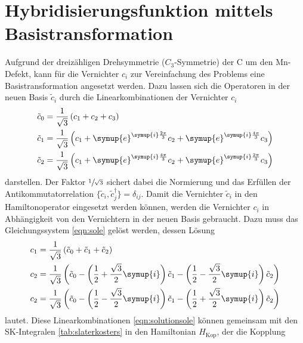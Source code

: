 \section{Hybridisierungsfunktion mittels Basistransformation}
Aufgrund der dreizähligen Drehsymmetrie ($C_3$-Symmetrie) der C um den Mn-Defekt, kann für die Vernichter $c_i$ zur Vereinfachung des Problems eine
Basistransformation angesetzt werden.
Dazu lassen sich die Operatoren in der neuen Basis $\tilde{c}_i$ durch die Linearkombinationen der Vernichter $c_i$
\begin{equation}
    \begin{aligned}
    \tilde{c}_0 &= \frac{1}{\sqrt{3}}\left (c_1 + c_2 + c_3 \right ) \\
    \tilde{c}_1 &= \frac{1}{\sqrt{3}}\left (c_1+ \symup{e}^{\symup{i}\frac{2\pi}{3}} c_2 + \symup{e}^{\symup{i}\frac{4\pi}{3}}c_3 \right ) \\
    \tilde{c}_2 &= \frac{1}{\sqrt{3}}\left (c_1 + \symup{e}^{\symup{i}\frac{4\pi}{3}} c_2 + \symup{e}^{\symup{i}\frac{2\pi}{3}}c_3 \right ) \label{eqn:sole} 
    \end{aligned}
\end{equation}
darstellen. 
Der Faktor $\sfrac{1}{\sqrt{3}}$ sichert dabei die Normierung und das Erfüllen der Antikommutatorrelation $\{\tilde{c}_i,\tilde{c}^\dagger_j\} = \delta_{ij}$.
Damit die Vernichter $\tilde{c}_i$ in den Hamiltonoperator eingesetzt werden können, werden die Vernichter $c_i$ in Abhängigkeit von den Vernichtern in
der neuen Basis gebraucht. 
Dazu muss das Gleichungssystem \eqref{eqn:sole} gelöst werden, dessen Lösung    
\begin{equation}
    \begin{aligned}
    c_1 &= \frac{1}{\sqrt{3}}\left (\tilde{c}_0 + \tilde{c}_1 + \tilde{c}_2 \right ) \\
    c_2 &= \frac{1}{\sqrt{3}}\left (\tilde{c}_0 - \left(\frac{1}{2} + \frac{{\sqrt{3}}}{2} \symup{i} \right) \tilde{c}_1 - \left ( \frac{1}{2} - \frac{{\sqrt{3}}}{2} \symup{i} \right ) \tilde{c}_2 \right ) \\
    c_2 &= \frac{1}{\sqrt{3}}\left (\tilde{c}_0 - \left(  \frac{1}{2} - \frac{{\sqrt{3}}}{2} \symup{i} \right) \tilde{c}_1 - \left ( \frac{1}{2} + \frac{{\sqrt{3}}}{2} \symup{i} \right ) \tilde{c}_2 \right ) 
    \label{eqn:solutionsole}
    \end{aligned}
\end{equation}
lautet.
Diese Linearkombinationen \eqref{eqn:solutionsole} können gemeinsam mit den SK-Integralen \ref{tab:slaterkosters} in den Hamiltonian $H_\text{Kop}$, der die Kopplung 

